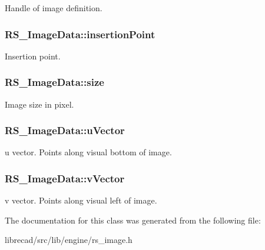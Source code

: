 Handle of image definition. \hypertarget{classRS__ImageData_aaf6f77de66abe74d9a22323721a01b43}{
\subsubsection[{insertion\-Point}]{ R\-S\-\_\-\-Image\-Data\-::insertion\-Point}}\label{classRS__ImageData_aaf6f77de66abe74d9a22323721a01b43}
Insertion point. \hypertarget{classRS__ImageData_a61be922fb59669f261444420eb95838e}{
\subsubsection[{size}]{ R\-S\-\_\-\-Image\-Data\-::size}}\label{classRS__ImageData_a61be922fb59669f261444420eb95838e}
Image size in pixel. \hypertarget{classRS__ImageData_a1313726d8b7c341fdce24d3173504845}{
\subsubsection[{u\-Vector}]{ R\-S\-\_\-\-Image\-Data\-::u\-Vector}}\label{classRS__ImageData_a1313726d8b7c341fdce24d3173504845}
u vector. Points along visual bottom of image. \hypertarget{classRS__ImageData_addc13777db6fc456f6d60dd4deb170db}{
\subsubsection[{v\-Vector}]{ R\-S\-\_\-\-Image\-Data\-::v\-Vector}}\label{classRS__ImageData_addc13777db6fc456f6d60dd4deb170db}
v vector. Points along visual left of image. 

The documentation for this class was generated from the following file\-:\begin{DoxyCompactItemize}
\item 
librecad/src/lib/engine/rs\-\_\-image.\-h\end{DoxyCompactItemize}
